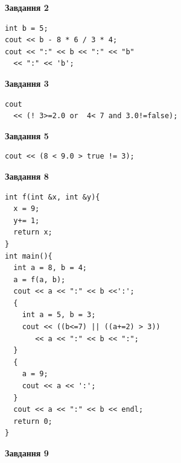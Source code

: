 \documentclass[12pt, ukrainian]{article}
\begin{document}
{\begin {large}
\begin{minipage}[t]{7.0cm}
\end{minipage}
\vline \hspace{1mm}
\begin{minipage}[t]{11.0cm}

\begin{center}
\textbf{Завдання 2}
\end{center}
\vspace{-8mm}

\begin{verbatim}
int b = 5;
cout << b - 8 * 6 / 3 * 4;
cout << ":" << b << ":" << "b" 
  << ":" << 'b';
\end{verbatim}



\begin{center}
\textbf{Завдання 3}
\end{center}
\vspace{-8mm}

\begin{verbatim}
cout 
  << (! 3>=2.0 or  4< 7 and 3.0!=false);
\end{verbatim}



\begin{center}
\textbf{Завдання 5}
\end{center}
\vspace{-8mm}

\begin{verbatim}
cout << (8 < 9.0 > true != 3);
\end{verbatim}



\begin{center}
\textbf{Завдання 8}
\end{center}
\vspace{-8mm}

\begin{verbatim}
int f(int &x, int &y){
  x = 9;
  y+= 1;
  return x;
}
int main(){
  int a = 8, b = 4;
  a = f(a, b);
  cout << a << ":" << b <<':';
  {
    int a = 5, b = 3;
    cout << ((b<=7) || ((a+=2) > 3))
       << a << ":" << b << ":";
  }
  {
    a = 9;
    cout << a << ':';
  }
  cout << a << ":" << b << endl;
  return 0;
}
\end{verbatim}

\end{minipage}


\begin{minipage}[t]{7.0cm}

\begin{center}
\textbf{Завдання 9}
\end{center}
\vspace{-8mm}


\end{minipage}
\end{large}}
\end{document}
